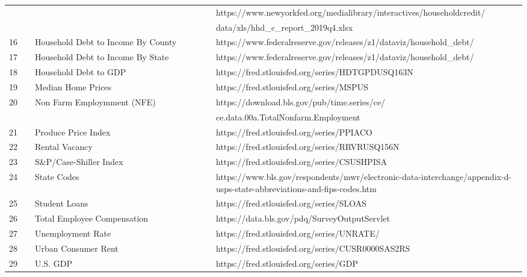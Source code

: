\documentclass[sigconf,nonacm,11pt]{acmart}
\begin{document}
\begin{appendix}
\begin{table}[ht]
\begin{tabular}{p{0.05\linewidth}p{0.35\linewidth}p{0.6\linewidth}}
 & & https://www.newyorkfed.org/medialibrary/interactives/householdcredit/\\
 & & data/xls/hhd\_c\_report\_2019q4.xlsx\\
16 & Household Debt to Income By County & https://www.federalreserve.gov/releases/z1/dataviz/household\_debt/\\
17 & Household Debt to Income By State  & https://www.federalreserve.gov/releases/z1/dataviz/household\_debt/\\
18 & Household Debt to GDP & https://fred.stlouisfed.org/series/HDTGPDUSQ163N\\
19 & Median Home Prices & https://fred.stlouisfed.org/series/MSPUS\\
20 & Non Farm Employmment (NFE) & https://download.bls.gov/pub/time.series/ce/\\
 & & ce.data.00a.TotalNonfarm.Employment\\
21 & Produce Price Index  & https://fred.stlouisfed.org/series/PPIACO\\
22 & Rental Vacancy & https://fred.stlouisfed.org/series/RRVRUSQ156N\\
23 & S\&P/Case-Shiller Index & https://fred.stlouisfed.org/series/CSUSHPISA\\
24 & State Codes & https://www.bls.gov/respondents/mwr/electronic-data-interchange/appendix-d-usps-state-abbreviations-and-fips-codes.htm\\
25 & Student Loans & https://fred.stlouisfed.org/series/SLOAS\\
26 & Total Employee Compensation & https://data.bls.gov/pdq/SurveyOutputServlet\\
27 & Unemployment Rate & https://fred.stlouisfed.org/series/UNRATE/\\
28 & Urban Consumer Rent & https://fred.stlouisfed.org/series/CUSR0000SAS2RS\\
29 & U.S. GDP  & https://fred.stlouisfed.org/series/GDP\\
\hline
\end{tabular}
\end{table}





\end{appendix}
\end{document}

